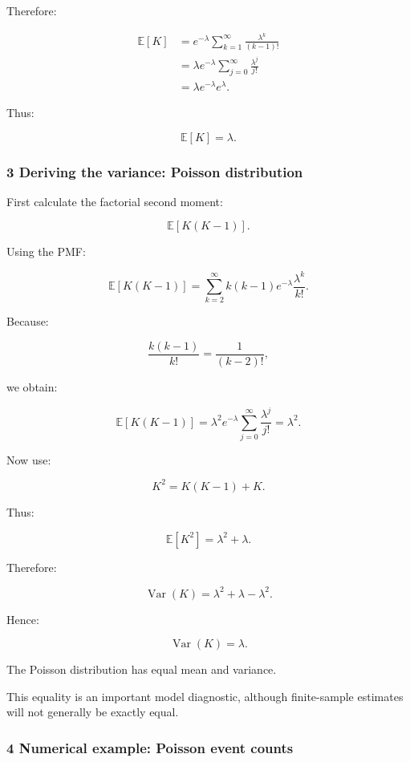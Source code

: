 Therefore:

\[
 \begin{aligned} \mathbb E[K] &= e^{-\lambda} \sum_{k=1}^\infty \frac{\lambda^k}{(k-1)!}\\ &= \lambda e^{-\lambda} \sum_{j=0}^\infty \frac{\lambda^j}{j!}\\ &=\lambda e^{-\lambda}e^\lambda. \end{aligned}
\]

Thus:

\[
 \boxed{\mathbb E[K]=\lambda}.
\]

\subsubsection{3 Deriving the variance: Poisson distribution}\label{02-foundations-ii-ch024-deriving-the-variance-poisson-distribution}

\hypertarget{02-foundations-ii-ch024-deriving-the-variance-poisson-distribution}{}

First calculate the factorial second moment:

\[
 \mathbb E[K(K-1)].
\]

Using the PMF:

\[
 \mathbb E[K(K-1)] = \sum_{k=2}^\infty k(k-1)e^{-\lambda} \frac{\lambda^k}{k!}.
\]

Because:

\[
 \frac{k(k-1)}{k!}=\frac1{(k-2)!},
\]

we obtain:

\[
 \mathbb E[K(K-1)] = \lambda^2e^{-\lambda} \sum_{j=0}^{\infty}\frac{\lambda^j}{j!} =\lambda^2.
\]

Now use:

\[
 K^2=K(K-1)+K.
\]

Thus:

\[
 \mathbb E[K^2] = \lambda^2+\lambda.
\]

Therefore:

\[
 \operatorname{Var}(K) = \lambda^2+\lambda-\lambda^2.
\]

Hence:

\[
 \boxed{ \operatorname{Var}(K)=\lambda }.
\]

The Poisson distribution has equal mean and variance.

This equality is an important model diagnostic, although finite-sample estimates will not generally be exactly equal.

\subsubsection{4 Numerical example: Poisson event counts}\label{02-foundations-ii-ch024-numerical-example-poisson-event-counts}

